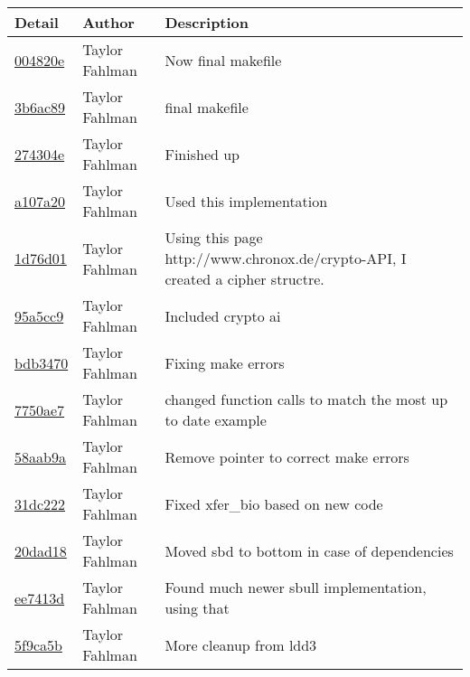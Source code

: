 \begin{tabular}{l l l}\textbf{Detail} & \textbf{Author} & \textbf{Description}\\\hline
\href{https://github.com/fahlmant/cs444/commit/004820e9120570f2fa0627732e0de21668eaed13}{004820e} & Taylor Fahlman & Now final makefile\\\hline
\href{https://github.com/fahlmant/cs444/commit/3b6ac89e287e3eaca2b3cb1f7aca8094c2c9bf5c}{3b6ac89} & Taylor Fahlman & final makefile\\\hline
\href{https://github.com/fahlmant/cs444/commit/274304e04de3ce8f0b5e485445ff16700a98b0b0}{274304e} & Taylor Fahlman & Finished up\\\hline
\href{https://github.com/fahlmant/cs444/commit/a107a206c3be4de2a7aee2b657ae7a98eb04a68a}{a107a20} & Taylor Fahlman & Used this implementation\\\hline
\href{https://github.com/fahlmant/cs444/commit/1d76d01de43b06dbe9dab7951763ed1848c9e6c8}{1d76d01} & Taylor Fahlman & Using this page http://www.chronox.de/crypto-API, I created a cipher structre.\\\hline
\href{https://github.com/fahlmant/cs444/commit/95a5cc9c095e5a588b9813ad579cc838c5f142f7}{95a5cc9} & Taylor Fahlman & Included crypto ai\\\hline
\href{https://github.com/fahlmant/cs444/commit/bdb34702a8d5df714e0d60f94ad42670a1d9e2a6}{bdb3470} & Taylor Fahlman & Fixing make errors\\\hline
\href{https://github.com/fahlmant/cs444/commit/7750ae7de8401e83a4a038af4ae1db2884a9e71e}{7750ae7} & Taylor Fahlman & changed function calls to match the most up to date example\\\hline
\href{https://github.com/fahlmant/cs444/commit/58aab9ac4d09ff701e74675e4c780d8175c93bad}{58aab9a} & Taylor Fahlman & Remove pointer to correct make errors\\\hline
\href{https://github.com/fahlmant/cs444/commit/31dc2229f379fc0465c67536249135c513a75807}{31dc222} & Taylor Fahlman & Fixed xfer_bio based on new code\\\hline
\href{https://github.com/fahlmant/cs444/commit/20dad183ac4d3f832c3897a2074652a697506bbc}{20dad18} & Taylor Fahlman & Moved sbd to bottom in case of dependencies\\\hline
\href{https://github.com/fahlmant/cs444/commit/ee7413dc03341028540620375482c5a7e72f729c}{ee7413d} & Taylor Fahlman & Found much newer sbull implementation, using that\\\hline
\href{https://github.com/fahlmant/cs444/commit/5f9ca5b506e502aaa1e4103dbdc7c91220471bd6}{5f9ca5b} & Taylor Fahlman & More cleanup from ldd3\\\hline

\end{tabular}
